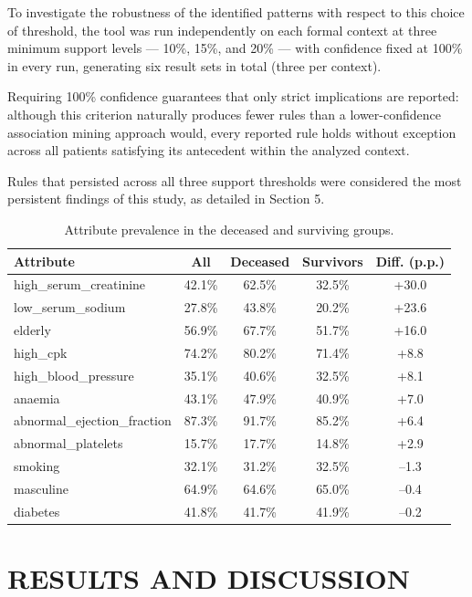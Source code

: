 \documentclass[a4paper,twoside]{article}
\begin{document}
To investigate the robustness of the identified patterns with respect to this choice of threshold, the tool was run independently on each formal context at three minimum support levels --- 10\%, 15\%, and 20\% --- with confidence fixed at 100\% in every run, generating six result sets in total (three per context).

Requiring 100\% confidence guarantees that only strict implications are reported: although this criterion naturally produces fewer rules than a lower-confidence association mining approach would, every reported rule holds without exception across all patients satisfying its antecedent within the analyzed context.

Rules that persisted across all three support thresholds were considered the most persistent findings of this study, as detailed in Section 5.

\begin{table}[hbt]
\caption{Attribute prevalence in the deceased and surviving groups.}\label{tab:prevalence}
\centering
{
\begin{tabular}{|l|c|c|c|c|}
  \hline
  \textbf{Attribute} & \textbf{All} & \textbf{Deceased} & \textbf{Survivors} & \textbf{Diff. (p.p.)} \\
  \hline
  high\_serum\_creatinine & 42.1\% & 62.5\% & 32.5\% & +30.0 \\
  low\_serum\_sodium & 27.8\% & 43.8\% & 20.2\% & +23.6 \\
  elderly & 56.9\% & 67.7\% & 51.7\% & +16.0 \\
  high\_cpk & 74.2\% & 80.2\% & 71.4\% & +8.8 \\
  high\_blood\_pressure & 35.1\% & 40.6\% & 32.5\% & +8.1 \\
  anaemia & 43.1\% & 47.9\% & 40.9\% & +7.0 \\
  abnormal\_ejection\_fraction & 87.3\% & 91.7\% & 85.2\% & +6.4 \\
  abnormal\_platelets & 15.7\% & 17.7\% & 14.8\% & +2.9 \\
  smoking & 32.1\% & 31.2\% & 32.5\% & --1.3 \\
  masculine & 64.9\% & 64.6\% & 65.0\% & --0.4 \\
  diabetes & 41.8\% & 41.7\% & 41.9\% & --0.2 \\
  \hline
\end{tabular}}
\end{table}

\section{\uppercase{Results and Discussion}}
\label{sec:results}
\end{document}
